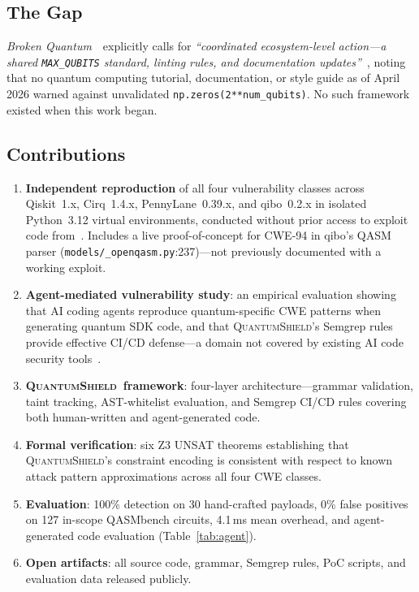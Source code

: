 \documentclass[conference,compsoc]{IEEEtran}
\newcommand{\tool}{\textsc{QuantumShield}}
\newcommand{\broken}{\textit{Broken Quantum}~\cite{blain2026broken}}
\begin{document}
\subsection{The Gap}
\noindent\broken\ explicitly calls for \textit{``coordinated ecosystem-level
action---a shared \texttt{MAX\_QUBITS} standard, linting rules, and
documentation updates''}~\cite{blain2026broken}, noting that no quantum
computing tutorial, documentation, or style guide as of April 2026
warned against unvalidated \texttt{np.zeros(2**num\_qubits)}.
No such framework existed when this work began.

\subsection{Contributions}
\begin{enumerate}[leftmargin=*,topsep=2pt,itemsep=1pt]
  \item \textbf{Independent reproduction} of all four vulnerability
    classes across Qiskit~1.x, Cirq~1.4.x, PennyLane~0.39.x, and
    qibo~0.2.x in isolated Python~3.12 virtual environments, conducted
    without prior access to exploit code from~\cite{blain2026broken}.
    Includes a live proof-of-concept for CWE-94 in qibo's QASM parser
    (\texttt{models/\_openqasm.py}:237)---not previously documented
    with a working exploit.
  \item \textbf{Agent-mediated vulnerability study}: an empirical
    evaluation showing that AI coding agents reproduce quantum-specific
    CWE patterns when generating quantum SDK code, and that \tool's
    Semgrep rules provide effective CI/CD defense---a domain not
    covered by existing AI code security tools~\cite{bbd2026,vibeguard2026}.
  \item \textbf{\tool\ framework}: four-layer architecture---grammar
    validation, taint tracking, AST-whitelist evaluation, and Semgrep
    CI/CD rules covering both human-written and agent-generated code.
  \item \textbf{Formal verification}: six Z3 UNSAT theorems establishing
    that \tool's constraint encoding is consistent with respect to
    known attack pattern approximations across all four CWE classes.
  \item \textbf{Evaluation}: 100\% detection on 30 hand-crafted payloads,
    0\% false positives on 127 in-scope QASMbench circuits, 4.1\,ms
    mean overhead, and agent-generated code evaluation (Table~\ref{tab:agent}).
  \item \textbf{Open artifacts}: all source code, grammar, Semgrep
    rules, PoC scripts, and evaluation data released publicly.
\end{enumerate}
\end{document}
